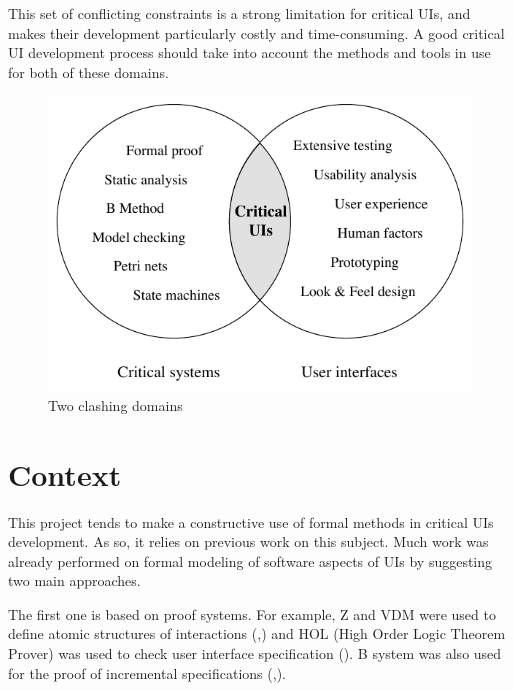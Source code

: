 \documentclass{sigchi}
\begin{document}
This  set  of conflicting  constraints  is  a  strong limitation  for critical  UIs, and  makes  their development  particularly costly  and time-consuming. A good critical  UI development process should take  into account the methods   and  tools   in  use   for  both   of  these   domains. 

\begin{figure}[htbp]
\begin{center}
\includegraphics[width=0.8\columnwidth]{twoclashingdomains}
\caption{Two clashing domains}
\label{fig:twoclashingdomains}
\end{center}
\end{figure}



\section{Context}

This project  tends to  make a constructive  use of formal  methods in critical UIs development.  As so, it relies on  previous work on this subject.  Much work  was already  performed on  formal  modeling of software aspects of UIs by suggesting two main approaches. 

The first one is based on proof systems.
For example, Z and  VDM  were  used  to  define  atomic  structures  of  interactions (\cite{Duke-Harrison93a},\cite{Duke-Harrison93b}) and  HOL (High Order Logic Theorem  Prover) was used to check  user interface specification (\cite{Bumbulis96}).  B system was also  used for the proof of incremental specifications  (\cite{yamine98a},\cite{yamine04}).
\end{document}
